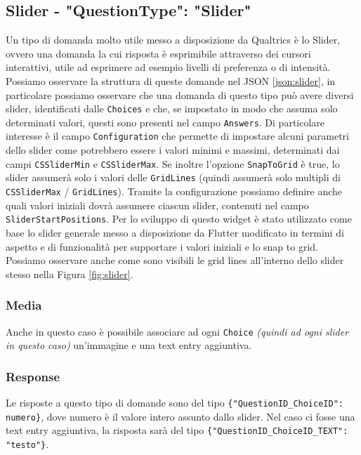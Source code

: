 \clearpage
\subsection{Slider - "QuestionType": "Slider"}
Un tipo di domanda molto utile messo a disposizione da Qualtrics è lo Slider, ovvero una domanda la cui risposta è esprimibile attraverso dei cursori interattivi, utile ad esprimere ad esempio livelli di preferenza o di intensità. Possiamo osservare la struttura di queste domande nel JSON \ref{json:slider}, in particolare possiamo osservare che una domanda di questo tipo può avere diversi slider, identificati dalle \texttt{Choices} e che, se impostato in modo che assuma solo determinati valori, questi sono presenti nel campo \texttt{Answers}. Di particolare interesse è il campo \texttt{Configuration} che permette di impostare alcuni parametri dello slider come potrebbero essere i valori minimi e massimi, determinati dai campi \texttt{CSSliderMin} e \texttt{CSSliderMax}. Se inoltre l'opzione \texttt{SnapToGrid} è true, lo slider assumerà solo i valori delle \texttt{GridLines} (quindi assumerà solo multipli di \texttt{CSSliderMax} / \texttt{GridLines}). Tramite la configurazione possiamo definire anche quali valori iniziali dovrà assumere ciascun slider, contenuti nel campo \texttt{SliderStartPositions}.
Per lo sviluppo di questo widget è stato utilizzato come base lo slider generale messo a disposizione da Flutter modificato in termini di aspetto e di funzionalità per supportare i valori iniziali e lo snap to grid. Possiamo osservare anche come sono visibili le grid lines all'interno dello slider stesso nella Figura \ref{fig:slider}.

\subsubsection{Media}
Anche in questo caso è possibile associare ad ogni \texttt{Choice} \textit{(quindi ad ogni slider in questo caso)} un'immagine e una text entry aggiuntiva.

\subsubsection{Response}
Le risposte a questo tipo di domande sono del tipo \texttt{\{"QuestionID\_ChoiceID": numero\}}, dove numero è il valore intero assunto dallo slider. Nel caso ci fosse una text entry aggiuntiva, la risposta sarà del tipo \texttt{\{"QuestionID\_ChoiceID\_TEXT": "testo"\}}.


